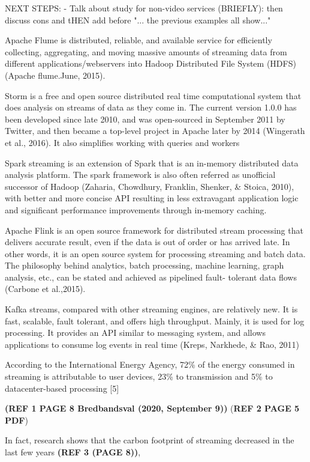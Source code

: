 NEXT STEPS:
- Talk about study for non-video services (BRIEFLY): then discuss cons and tHEN add before "... the previous examples all show..."

Apache Flume is distributed, reliable, and available service for efficiently collecting,
aggregating, and moving massive amounts of streaming data from different
applications/webservers into Hadoop Distributed File System (HDFS)(Apache
flume.June, 2015).

Storm is a free and open source distributed real time computational system that does
analysis on streams of data as they come in. The current version 1.0.0 has been
developed since late 2010, and was open-sourced in September 2011 by Twitter, and
then became a top-level project in Apache later by 2014 (Wingerath et al., 2016). It
also simplifies working with queries and workers

Spark streaming is an extension of Spark that is an in-memory distributed data
analysis platform. The spark framework is also often referred as unofficial successor
of Hadoop (Zaharia, Chowdhury, Franklin, Shenker, \& Stoica, 2010), with better and
more concise API resulting in less extravagant application logic and significant
performance improvements through in-memory caching.

Apache Flink is an open source framework for distributed stream processing that
delivers accurate result, even if the data is out of order or has arrived late. In other
words, it is an open source system for processing streaming and batch data. The philosophy behind analytics, batch processing, machine learning, graph analysis, etc., can be stated and achieved as pipelined fault- tolerant data flows (Carbone et al.,2015).

Kafka streams, compared with other streaming engines, are relatively new. It is fast,
scalable, fault tolerant, and offers high throughput. Mainly, it is used for log
processing. It provides an API similar to messaging system, and allows applications
to consume log events in real time (Kreps, Narkhede, \& Rao, 2011)

According to the International Energy Agency,
72\% of the energy consumed in streaming is attributable to user
devices, 23\% to transmission and 5\% to datacenter-based processing [5]


\textbf{(REF 1 PAGE 8 Bredbandsval (2020, September 9))}
(\textbf{REF 2 PAGE 5 PDF})

In fact, research shows that the carbon footprint of streaming decreased in the last few years \textbf{(REF 3 (PAGE 8))},